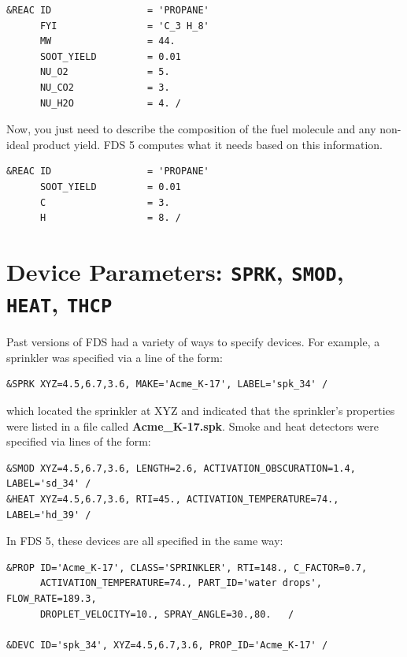 \documentclass[11pt]{book}
\begin{document}
\footnotesize
\begin{verbatim}
&REAC ID                 = 'PROPANE'
      FYI                = 'C_3 H_8'
      MW                 = 44.
      SOOT_YIELD         = 0.01
      NU_O2              = 5.
      NU_CO2             = 3.
      NU_H2O             = 4. /
\end{verbatim}
\normalsize

\noindent
Now, you just need to describe the composition of the fuel molecule and any non-ideal product yield. FDS 5 computes what it needs based on
this information.

\footnotesize
\begin{verbatim}
&REAC ID                 = 'PROPANE'
      SOOT_YIELD         = 0.01
      C                  = 3.
      H                  = 8. /
\end{verbatim}
\normalsize


\section{Device Parameters: \texorpdfstring{{\tt SPRK}}{SPRK}, \texorpdfstring{{\tt SMOD}}{SMOD},
\texorpdfstring{{\tt HEAT}}{HEAT}, \texorpdfstring{{\tt THCP}}{THCP}}

Past versions of FDS had a variety of ways to specify devices. For example, a sprinkler was specified via a line of the form:

\footnotesize
\begin{verbatim}
&SPRK XYZ=4.5,6.7,3.6, MAKE='Acme_K-17', LABEL='spk_34' /
\end{verbatim} \normalsize

\noindent
which located the sprinkler at {\ct XYZ} and indicated that the sprinkler's properties were listed in a file called {\bf Acme\_K-17.spk}.
Smoke and heat detectors were specified via lines of the form:

\footnotesize
\begin{verbatim}
&SMOD XYZ=4.5,6.7,3.6, LENGTH=2.6, ACTIVATION_OBSCURATION=1.4, LABEL='sd_34' /
&HEAT XYZ=4.5,6.7,3.6, RTI=45., ACTIVATION_TEMPERATURE=74., LABEL='hd_39' /
\end{verbatim} \normalsize

\noindent
In FDS 5, these devices are all specified in the same way:

\footnotesize
\begin{verbatim}
&PROP ID='Acme_K-17', CLASS='SPRINKLER', RTI=148., C_FACTOR=0.7,
      ACTIVATION_TEMPERATURE=74., PART_ID='water drops', FLOW_RATE=189.3,
      DROPLET_VELOCITY=10., SPRAY_ANGLE=30.,80.   /

&DEVC ID='spk_34', XYZ=4.5,6.7,3.6, PROP_ID='Acme_K-17' /
\end{verbatim} \normalsize
\end{document}
